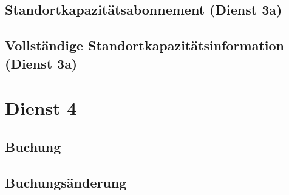\subsection*{Standortkapazitätsabonnement (Dienst 3a)}
\label{subsec:Nachrichten:Dienst3:PlaceAvailabilitySubscription}





% 

% 



\subsection*{Vollständige Standortkapazitätsinformation (Dienst 3a)}
\label{subsec:Nachrichten:Dienst3:CompletePlaceAvailability}





\section{Dienst 4}
\label{sec:Nachrichten:Dienst4}

\subsection*{Buchung}
\label{subsec:Nachrichten:Dienst4:Booking}





\subsection*{Buchungsänderung}
\label{subsec:Nachrichten:Dienst4:ChangeBooking}





